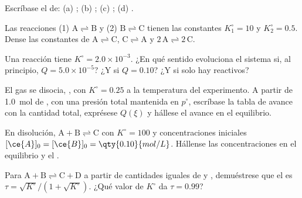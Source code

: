 \begin{exercise}[$\star$]\label{exo:b1:extent-q-and-k:4}
Escríbase el  de: (a) ;
(b) ; (c) ; (d) .
\end{exercise}

\begin{exercise}[$\star\star$]\label{exo:b1:extent-q-and-k:5}
Las reacciones (1) $\mathrm{A \rightleftharpoons B}$ y (2) $\mathrm{B \rightleftharpoons C}$ tienen las constantes
$K_1^\circ = 10$ y $K_2^\circ = 0.5$. Dense las constantes de $\mathrm{A \rightleftharpoons C}$,
$\mathrm{C \rightleftharpoons A}$ y $\mathrm{2\,A \rightleftharpoons 2\,C}$.
\end{exercise}

\begin{exercise}[$\star\star$]\label{exo:b1:extent-q-and-k:6}
Una reacción tiene $K^\circ = 2.0 \times 10^{-3}$. ¿En qué sentido
evoluciona el sistema si, al principio, $Q = 5.0 \times 10^{-5}$? ¿Y si
$Q = 0.10$? ¿Y si solo hay reactivos?
\end{exercise}

\begin{exercise}[$\star\star$]\label{exo:b1:extent-q-and-k:7}
El gas  se disocia, , con $K^\circ = 0.25$ a
la temperatura del experimento. A partir de \qty{1.0}{mol} de , con
una presión total mantenida en $p^\circ$, escríbase la tabla de avance
con la cantidad total, exprésese $Q(\xi)$ y hállese el avance en el
equilibrio.
\end{exercise}

\begin{exercise}[$\star\star$]\label{exo:b1:extent-q-and-k:8}
En disolución, $\mathrm{A + B \rightleftharpoons C}$ con $K^\circ = 100$ y
concentraciones iniciales $[\ce{A}]_0 = [\ce{B}]_0 = \qty{0.10}{mol/L}$.
Hállense las concentraciones en el equilibrio y el .
\end{exercise}

\begin{exercise}[$\star\star$]\label{exo:b1:extent-q-and-k:9}
Para $\mathrm{A + B \rightleftharpoons C + D}$ a partir de cantidades
iguales de  y , demuéstrese que el  es
$\tau = \sqrt{K^\circ}/(1 + \sqrt{K^\circ})$. ¿Qué valor de $K^\circ$ da
$\tau = 0.99$?
\end{exercise}

